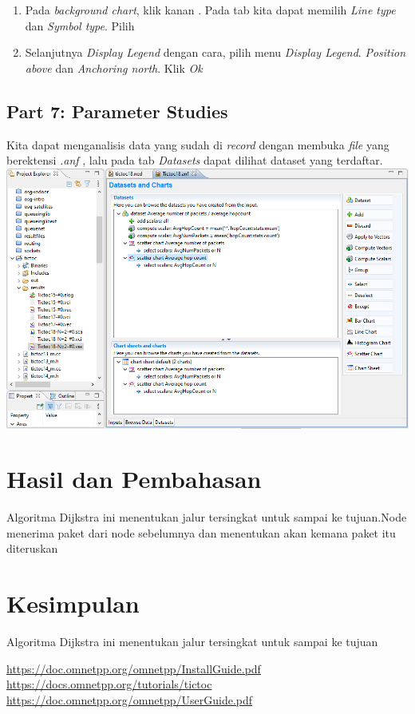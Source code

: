 \documentclass[conference]{IEEEtran}
\begin{document}
\begin{enumerate}
	\item Pada \textit{background chart}, klik kanan . Pada tab  kita dapat memilih \textit{Line type} dan \textit{Symbol type}. Pilih 
	\item Selanjutnya \textit{Display Legend} dengan cara, pilih menu  \textit{Display Legend}. \textit{Position above} dan \textit{Anchoring north}. Klik \textit{Ok}
\end{enumerate}

\subsection{Part 7: Parameter Studies}
Kita dapat menganalisis data yang sudah di \textit{record} dengan membuka \textit{file} yang berektensi \textit{.anf} , lalu pada tab \textit{Datasets} dapat dilihat dataset yang terdaftar.
\includegraphics[scale=0.18]{images/tictoc18-analysis-file.png}

\section{Hasil dan Pembahasan}
Algoritma Dijkstra ini menentukan jalur tersingkat untuk sampai ke tujuan.Node menerima paket dari node sebelumnya dan menentukan akan kemana paket itu diteruskan

\section{Kesimpulan}
Algoritma Dijkstra ini menentukan jalur tersingkat untuk sampai ke tujuan


\begin{thebibliography}{1}
	\url{https://doc.omnetpp.org/omnetpp/InstallGuide.pdf}
	\url{https://docs.omnetpp.org/tutorials/tictoc}
	\url{https://doc.omnetpp.org/omnetpp/UserGuide.pdf}
\end{thebibliography}
\end{document}
